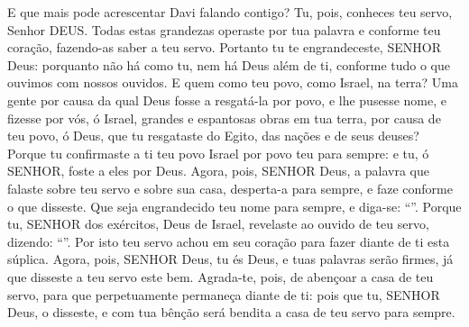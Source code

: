 {{  E que mais pode acrescentar Davi falando contigo? Tu, pois, conheces teu servo, Senhor DEUS.
  Todas estas grandezas operaste por tua palavra e conforme teu coração, fazendo-as saber a teu servo.
  Portanto tu te engrandeceste, SENHOR Deus: porquanto não há como tu, nem há Deus além de ti, conforme tudo o que ouvimos com nossos ouvidos.
  E quem como teu povo, como Israel, na terra? Uma gente por causa da qual Deus fosse a resgatá-la por povo, e lhe pusesse nome, e fizesse por vós, ó Israel, grandes e espantosas obras em tua terra, por causa de teu povo, ó Deus, que tu resgataste do Egito, das nações e de seus deuses?
  Porque tu confirmaste a ti teu povo Israel por povo teu para sempre: e tu, ó SENHOR, foste a eles por Deus.
  Agora, pois, SENHOR Deus, a palavra que falaste sobre teu servo e sobre sua casa, desperta-a para sempre, e faze conforme o que disseste.
  Que seja engrandecido teu nome para sempre, e diga-se: \enquote{}.
  Porque tu, SENHOR dos exércitos, Deus de Israel, revelaste ao ouvido de teu servo, dizendo: \enquote{}. Por isto teu servo achou em seu coração para fazer diante de ti esta súplica.
  Agora, pois, SENHOR Deus, tu és Deus, e tuas palavras serão firmes, já que disseste a teu servo este bem.
  Agrada-te, pois, de abençoar a casa de teu servo, para que perpetuamente permaneça diante de ti: pois que tu, SENHOR Deus, o disseste, e com tua bênção será bendita a casa de teu servo para sempre}.
\par }

